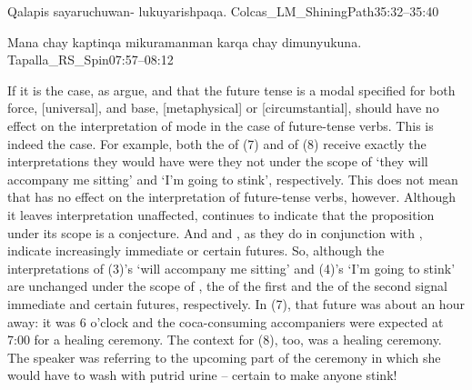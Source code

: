 %
{Qalapis sayaruchuwan- lukuyarishpaqa.}%
{}%
{Colcas\_LM\_ShiningPath}{35:32--35:40}%

%
{Mana chay kaptinqa mikuramanman karqa chay dimunyukuna.}%
{}%
{Tapalla\_RS\_Spin}{07:57--08:12}%

If it is the case, as \citet{Copley09} argue, and \citet{Matthewson05} that the future tense is a modal specified for both force, [universal], and base, [metaphysical] or [circumstantial],  should have no effect on the interpretation of mode in the case of future-tense verbs. This is indeed the case. For example, both the  of (7) and  of (8) receive exactly the interpretations they would have were they not under the scope of  `they will accompany me sitting' and `I'm going to stink', respectively. This does not mean that  has no effect on the interpretation of future-tense verbs, however. Although it leaves  interpretation unaffected,  continues to indicate that the proposition under its scope is a conjecture. And  and , as they do in conjunction with , indicate increasingly immediate or certain futures. So, although the  interpretations of (3)'s  `will accompany me sitting' and (4)'s  `I'm going to stink' are unchanged under the scope of , the  of the first and the  of the second signal immediate and certain futures, respectively. In (7), that future was about an hour away: it was 6 o'clock and the coca-consuming accompaniers were expected at 7:00 for a healing ceremony. The context for (8), too, was a healing ceremony. The speaker was referring to the upcoming part of the ceremony in which she would have to wash with putrid urine -- certain to make anyone stink!


